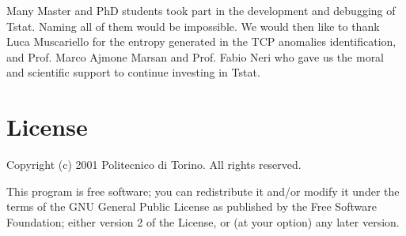 \documentclass[11pt]{article}
\newcommand{\printindex}[0]{} %
\begin{document}
Many Master and PhD students took part in the development and debugging of
Tstat. Naming all of them would be impossible. We would then like to thank Luca
Muscariello for the entropy generated in the TCP
anomalies identification, and Prof. Marco Ajmone Marsan and 
Prof. Fabio Neri who gave us the moral and scientific support to 
continue investing in Tstat.

\section{License\label{License}}


Copyright (c) 2001 Politecnico di Torino.  All rights reserved.



This program is free software; you can redistribute it and/or modify
it under the terms of the GNU General Public License as published by
the Free Software Foundation; either version 2 of the License, or
(at your option) any later version.

\printindex
\end{document}
